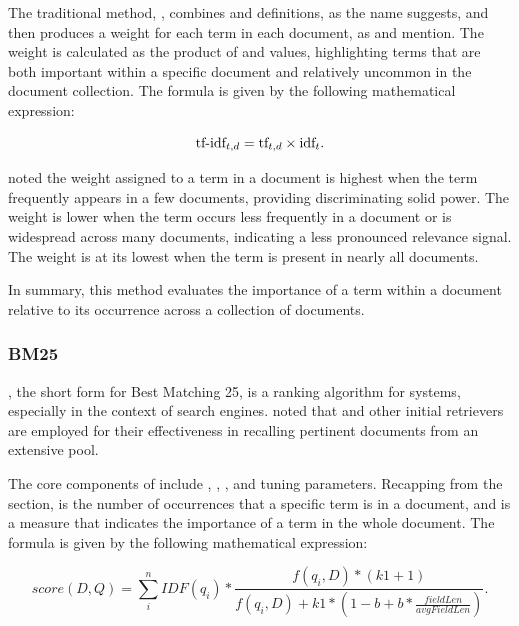 The traditional {\ir} method, {\tfidf}, combines  {\tf} and  {\idf} definitions, as the name suggests, and then produces a weight for each term in each document, as \citet{manning_introduction_2009} and \citet{chizhik_challenges_2020} mention. The weight is calculated as the product of  {\tf} and  {\idf} values, highlighting terms that are both important within a specific document and relatively uncommon in the document collection. The formula is given by the following mathematical expression:

\[ \textup{tf-idf}_{t,d} = \textup{tf}_{t,d} \times \textup{idf}_{t}. \]

\citet{manning_introduction_2009} noted the {\tfidf} weight assigned to a term in a document is highest when the term frequently appears in a few documents, providing discriminating solid power. The weight is lower when the term occurs less frequently in a document or is widespread across many documents, indicating a less pronounced relevance signal. The weight is at its lowest when the term is present in nearly all documents. 

In summary, this {\ir} method evaluates the importance of a term within a document relative to its occurrence across a collection of documents.


\subsubsection{BM25}

{\bm}, the short form for Best Matching 25, is a ranking algorithm for {\ir} systems, especially in the context of search engines. \citet{hambarde_information_2023} noted that {\bm} and other initial retrievers are employed for their effectiveness in recalling pertinent documents from an extensive pool.

The core components of {\bm} include {\tf}, {\idf}, {\dl}, and tuning parameters. Recapping from the {\tfidf} section, {\tf} is the number of occurrences that a specific term is in a document, and {\idf} is a measure that indicates the importance of a term in the whole document. The formula is given by the following mathematical expression:

\[ score(D,Q) = \sum_{i}^{n} IDF(q_{i}) \ast \frac{f(q_{i},D) \ast (k1 + 1)}{f(q_{i},D) + k1 \ast (1 - b + b \ast \frac{fieldLen}{avgFieldLen})}. \]



